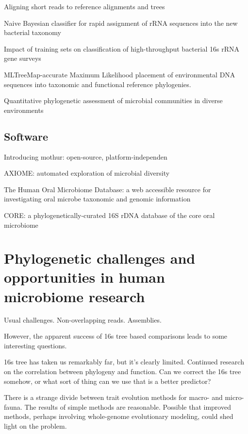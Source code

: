 \documentclass{amsart}
\begin{document}
\cite{berger2011aligning}
Aligning short reads to reference alignments and trees


\cite{wang2007naive}
{Naive Bayesian classifier for rapid assignment of rRNA sequences into the new bacterial taxonomy}

\cite{werner2011impact}
Impact of training sets on classification of high-throughput bacterial 16s rRNA gene surveys


\cite{stark2010mltreemap}
{{MLTreeMap}-accurate Maximum Likelihood placement of environmental DNA sequences into taxonomic and functional reference phylogenies.}

\cite{vonMeringEaQuantitative08}
{Quantitative phylogenetic assessment of microbial communities in diverse environments}

\subsection{Software}
\cite{caporaso2010qiime}

\cite{schloss2009introducing}
Introducing mothur: open-source, platform-independen

\cite{lynch2013axiome}
AXIOME: automated exploration of microbial diversity

\cite{chen2010human}
The Human Oral Microbiome Database: a web accessible resource for investigating oral microbe taxonomic and genomic information

\cite{griffen2011core}
CORE: a phylogenetically-curated 16S rDNA database of the core oral microbiome

\cite{srinivasan2012bacterial}


\section{Phylogenetic challenges and opportunities in human microbiome research}

Usual challenges.
Non-overlapping reads.
Assemblies.

However, the apparent success of 16s tree based comparisons leads to some interesting questions.

16s tree has taken us remarkably far, but it's clearly limited.
Continued research on the correlation between phylogeny and function.
Can we correct the 16s tree somehow, or what sort of thing can we use that is a better predictor?

There is a strange divide between trait evolution methods for macro- and micro-fauna.
The results of simple methods are reasonable.
Possible that improved methods, perhaps involving whole-genome evolutionary modeling, could shed light on the problem.
\end{document}
